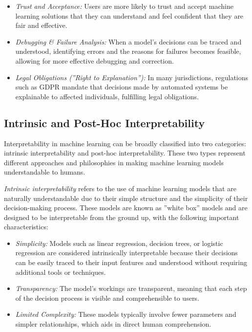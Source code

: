\begin{itemize}
\item \emph{Trust and Acceptance:} Users are more likely to trust and accept machine learning solutions that they can understand and feel confident that they are fair and effective.

\item \emph{Debugging \& Failure Analysis:} When a model's decisions can be traced and understood, identifying errors and the reasons for failures becomes feasible, allowing for more effective debugging and correction.

\item \emph{Legal Obligations (''Right to Explanation''):} In many jurisdictions, regulations such as GDPR mandate that decisions made by automated systems be explainable to affected individuals, fulfilling legal obligations.
\end{itemize}

\subsection*{Intrinsic and Post-Hoc Interpretability}

Interpretability in machine learning can be broadly classified into two categories: intrinsic interpretability and post-hoc interpretability. These two types represent different approaches and philosophies in making machine learning models understandable to humans. 

\emph{Intrinsic interpretability} refers to the use of machine learning models that are naturally understandable due to their simple structure and the simplicity of their decision-making process. These models are known as ''white box'' models and are designed to be interpretable from the ground up, with the following important characteristics:

\begin{itemize}
\item \emph{Simplicity:} Models such as linear regression, decision trees, or logistic regression are considered intrinsically interpretable because their decisions can be easily traced to their input features and understood without requiring additional tools or techniques.
\item \emph{Transparency:} The model's workings are transparent, meaning that each step of the decision process is visible and comprehensible to users.
\item \emph{Limited Complexity:} These models typically involve fewer parameters and simpler relationships, which aids in direct human comprehension.
\end{itemize}

